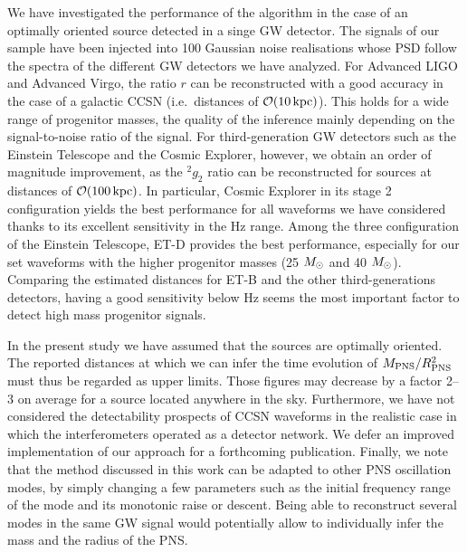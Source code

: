 We have investigated the performance of the algorithm in the case of an optimally oriented source detected in a singe GW detector. The signals of our sample have been injected into 100 Gaussian noise realisations whose PSD follow the spectra of the different GW detectors we have analyzed. For Advanced LIGO and Advanced Virgo, the ratio $r$ can be reconstructed with a good accuracy in the case of a galactic CCSN (i.e.~distances of ${\cal O}(10\, {\rm kpc})$). This holds for a wide range of progenitor masses, the quality of the inference mainly depending on the signal-to-noise ratio of the signal. For third-generation GW detectors such as the Einstein Telescope and the Cosmic Explorer, however, we obtain an order of magnitude improvement, as the $\mbox{}^2g_2$ ratio can be reconstructed for sources at distances of ${\cal O}(100\, {\rm kpc})$. In particular, Cosmic Explorer in its stage 2 configuration yields the best performance for all waveforms we have considered thanks to its excellent sensitivity in the \unit[100-1000]{Hz} range. Among the three configuration of the Einstein Telescope, ET-D provides the best performance, especially for our set waveforms with the higher progenitor masses (25 $M_{\odot}$ and 40 $M_{\odot}$). Comparing the estimated distances for ET-B and the other third-generations detectors, having a good sensitivity below \unit[200]{Hz} seems the most important factor to detect high mass progenitor signals.

In the present study we have assumed that the sources are optimally oriented. The reported distances at which
we can infer the time evolution of $M_{\rm PNS}/R_{\rm PNS}^2$ must thus be regarded as upper limits. Those figures may decrease by a factor 2--3 on average for a source located anywhere in the sky. Furthermore, we have not considered the detectability prospects of  CCSN waveforms in the realistic case in which the  interferometers operated as a detector network. 
We defer an improved implementation of our approach for a forthcoming publication. Finally, we note that the method discussed in this work can be adapted to other PNS oscillation modes, by simply changing a few parameters such as the initial frequency range of the mode and its monotonic raise or descent. Being able to reconstruct several modes in the same GW signal would potentially allow to individually infer the mass and the radius of the PNS.




